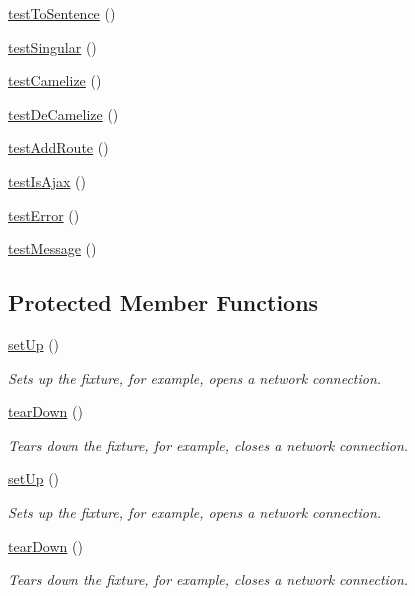 \begin{DoxyCompactItemize}
\item 
\hyperlink{class_ntentan_test_aa65644c1d96fa14989be0a26aa2f7535}{testToSentence} ()
\item 
\hyperlink{class_ntentan_test_a966f38ee2b1f603c4d7338da23ab97bd}{testSingular} ()
\item 
\hyperlink{class_ntentan_test_a7a0a8d44261cdf85110514516721787c}{testCamelize} ()
\item 
\hyperlink{class_ntentan_test_a5b5043d9c32a003ba9aeefd89c971251}{testDeCamelize} ()
\item 
\hyperlink{class_ntentan_test_ad43133e7705de1d451e03f3387ac108c}{testAddRoute} ()
\item 
\hyperlink{class_ntentan_test_aa0a1d05632570d59d8f832c6c558102d}{testIsAjax} ()
\item 
\hyperlink{class_ntentan_test_a37982b0da45a07b6be6a0df00b1d6e56}{testError} ()
\item 
\hyperlink{class_ntentan_test_a4671164255a55c7fea8e9a1aa5a5222b}{testMessage} ()
\end{DoxyCompactItemize}
\subsection*{Protected Member Functions}
\begin{DoxyCompactItemize}
\item 
\hyperlink{class_ntentan_test_a19994f548143f62ccce1ebfac0b735e3}{setUp} ()
\begin{DoxyCompactList}\small\item\em Sets up the fixture, for example, opens a network connection. \item\end{DoxyCompactList}\item 
\hyperlink{class_ntentan_test_a958f403c793638d37c49d8a594627170}{tearDown} ()
\begin{DoxyCompactList}\small\item\em Tears down the fixture, for example, closes a network connection. \item\end{DoxyCompactList}\item 
\hyperlink{class_ntentan_test_a19994f548143f62ccce1ebfac0b735e3}{setUp} ()
\begin{DoxyCompactList}\small\item\em Sets up the fixture, for example, opens a network connection. \item\end{DoxyCompactList}\item 
\hyperlink{class_ntentan_test_a958f403c793638d37c49d8a594627170}{tearDown} ()
\begin{DoxyCompactList}\small\item\em Tears down the fixture, for example, closes a network connection. \item\end{DoxyCompactList}\end{DoxyCompactItemize}
